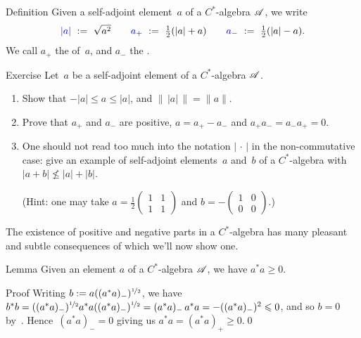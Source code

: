 \documentclass[a]{subfiles}
\begin{document}
\begin{parsec}
\begin{point}{Definition}
Given a self-adjoint element~$a$ of a $C^*$-algebra $\scrA$,
we write
\begin{equation*}
\textstyle
\Define{\left|a\right|}\ :=\ \sqrt{a^2}
\qquad
\Define{\pos{a}}\ :=\ \frac{1}{2}(\left|a\right| + a)
\qquad
\Define{a_{-}}\ :=\ \frac{1}{2}(\left|a\right| - a).
\end{equation*}%
We call $a_+$ the  of~$a$,
and $a_-$ the .
\end{point}
\begin{point}{Exercise}%
Let~$a$ be a self-adjoint element of a
 $C^*$-algebra $\scrA$.
\begin{enumerate}
\item
Show that $-\left|a\right| \leq a \leq \left| a \right|$,
and $\|\,\left|a\right|\,\|= \|a\|$.
\item
Prove that $a_+$ and $a_-$ are positive,  $a=a_+-a_-$
and $a_+a_-=a_-a_+=0$.
\item
One should not read too much into the notation
$\left|\,\cdot\,\right|$
in the non-commutative case:
give an example of
self-adjoint elements~$a$ and~$b$ of a $C^*$-algebra with
 $\left|a+b\right|\nleq \left|a\right|+ \left|b\right|$.

(Hint: one may take  
$a=\frac{1}{2}\left(\begin{smallmatrix}1 & 1 \\ 1 & 1\end{smallmatrix}\right)$
and $b=-\left(\begin{smallmatrix}1 & 0 \\ 0 & 0 \end{smallmatrix}\right)$.)
\end{enumerate}
\end{point}
\begin{point}%
The existence of positive and negative parts
in a $C^*$-algebra
has many pleasant and subtle consequences
of which we'll now show one.
\end{point}
\begin{point}{Lemma}%
Given an element $a$ of a $C^*$-algebra $\scrA$,
we have $a^*a\geq 0$.
\begin{point}{Proof}%
Writing $b:=a((a^*a)_-)^{\nicefrac{1}{2}}$,
we have $b^*b=
((a^*a)_-)^{\nicefrac{1}{2}} a^*a
((a^*a)_-)^{\nicefrac{1}{2}}
= (a^*a)_- \,a^*a
=
-((a^*a)_-)^2\leq 0$,
and so
$b=0$
by~.
Hence~$(a^*a)_-=0$ giving us $a^*a=(a^*a)_+\geq 0$.\qed
\end{point}
\end{point}
\end{parsec}
\end{document}
